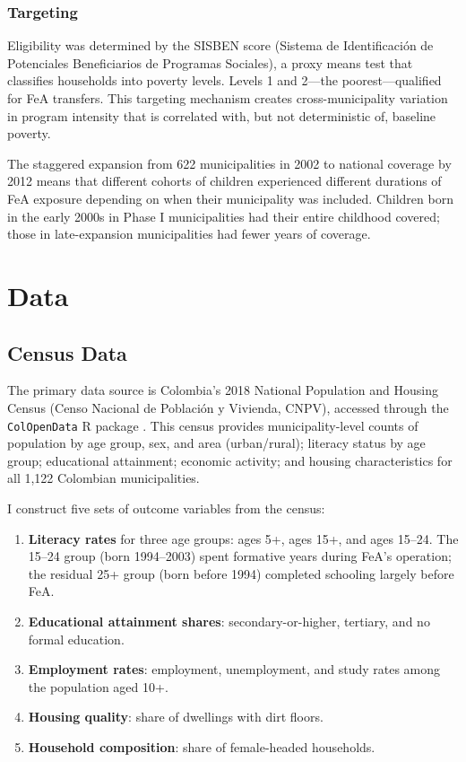 \documentclass[12pt]{article}
\begin{document}
\subsubsection*{Targeting} Eligibility was determined by the SISBEN score (Sistema de Identificaci\'{o}n de Potenciales Beneficiarios de Programas Sociales), a proxy means test that classifies households into poverty levels. Levels 1 and 2---the poorest---qualified for FeA transfers. This targeting mechanism creates cross-municipality variation in program intensity that is correlated with, but not deterministic of, baseline poverty.

The staggered expansion from 622 municipalities in 2002 to national coverage by 2012 means that different cohorts of children experienced different durations of FeA exposure depending on when their municipality was included. Children born in the early 2000s in Phase I municipalities had their entire childhood covered; those in late-expansion municipalities had fewer years of coverage.

\section{Data}
\label{sec:data}

\subsection{Census Data}

The primary data source is Colombia's 2018 National Population and Housing Census (Censo Nacional de Poblaci\'{o}n y Vivienda, CNPV), accessed through the \texttt{ColOpenData} R package \citep{colopendata}. This census provides municipality-level counts of population by age group, sex, and area (urban/rural); literacy status by age group; educational attainment; economic activity; and housing characteristics for all 1,122 Colombian municipalities.

I construct five sets of outcome variables from the census:
\begin{enumerate}
\item \textbf{Literacy rates} for three age groups: ages 5+, ages 15+, and ages 15--24. The 15--24 group (born 1994--2003) spent formative years during FeA's operation; the residual 25+ group (born before 1994) completed schooling largely before FeA.
\item \textbf{Educational attainment shares}: secondary-or-higher, tertiary, and no formal education.
\item \textbf{Employment rates}: employment, unemployment, and study rates among the population aged 10+.
\item \textbf{Housing quality}: share of dwellings with dirt floors.
\item \textbf{Household composition}: share of female-headed households.
\end{enumerate}
\end{document}
